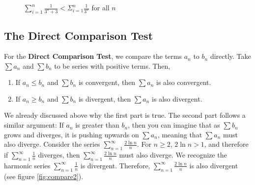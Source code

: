\begin{figure}
    \centering
    \caption{$\sum_{i=1}^n \frac{1}{3^n + 3} < \Sigma_{i = 1}^n 
    \frac{1}{3^n}$ for all $n$}
    \label{fig:compare1}
\end{figure}
\subsection{The Direct Comparison Test}
For the \textbf{Direct Comparison Test}, we 
compare the terms $a_n$ to $b_n$ directly. Take $\sum a_n$ and $\sum b_n$ to 
be series with positive terms. Then, 
\begin{enumerate}
\item If $a_n \leq b_n$ and $\sum b_n$ is convergent, then $\sum a_n$ is 
also convergent.
\item If $a_n \geq b_n$ and $\sum b_n$ is divergent, then $\sum a_n$ is 
also divergent.
\end{enumerate}

We already discussed above why the first part is true. The second part follows 
a similar argument: If $a_n$ is greater than $b_n$, then you can imagine that 
as $\sum b_n$ grows and diverges, it is pushing upwards on $\sum a_n$, 
meaning that $\sum a_n$ must also diverge. Consider the series $\sum_{n=1}^
\infty \frac{2\ln{n}}{n}$. For $n \geq 2$, $2\ln{n} > 1$, and therefore if 
$\sum_{n=1}^\infty \frac{1}{n}$ diverges, then $\sum_{n=1}^\infty \frac{2
\ln{n}}{n}$ must also diverge. We recognize the harmonic series $\sum_{n=1}^
\infty \frac{1}{n}$ is divergent. Therefore, $\sum_{n=1}^\infty 
\frac{2\ln{n}}{n}$ is also divergent (see figure \ref{fig:compare2}).

